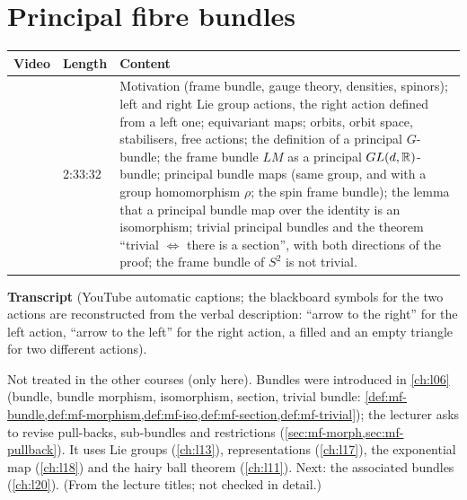 \chapter{Principal fibre bundles}\label{ch:l19}
\providecommand{\lact}{\mathbin{\triangleright}}
\providecommand{\ract}{\mathbin{\triangleleft}}
\providecommand{\lactf}{\mathbin{\blacktriangleright}}
\providecommand{\ractf}{\mathbin{\blacktriangleleft}}
\begin{paracol}{2}

\begin{sources}
\begin{tabularx}{\linewidth}{@{}l l L@{}}
\toprule
\textbf{Video} & \textbf{Length} & \textbf{Content}\\
\midrule
{} & 2:33:32 & Motivation (frame bundle, gauge theory, densities, spinors); left and right Lie group actions, the right action defined from a left one; equivariant maps; orbits, orbit space, stabilisers, free actions; the definition of a principal $G$-bundle; the frame bundle $LM$ as a principal $GL(d,\mathbb{R})$-bundle; principal bundle maps (same group, and with a group homomorphism $\rho$; the spin frame bundle); the lemma that a principal bundle map over the identity is an isomorphism; trivial principal bundles and the theorem ``trivial $\Leftrightarrow$ there is a section'', with both directions of the proof; the frame bundle of $S^2$ is not trivial.\\
\bottomrule
\end{tabularx}

\smallskip
\textbf{Transcript}  (YouTube automatic captions; the blackboard symbols for the two actions are reconstructed from the verbal description: ``arrow to the right'' for the left action, ``arrow to the left'' for the right action, a filled and an empty triangle for two different actions).
\end{sources}

\begin{reading}
Not treated in the other courses (only here). Bundles were introduced in \cref{ch:l06} (bundle, bundle morphism, isomorphism, section, trivial bundle: \cref{def:mf-bundle,def:mf-morphism,def:mf-iso,def:mf-section,def:mf-trivial}); the lecturer asks to revise pull-backs, sub-bundles and restrictions (\cref{sec:mf-morph,sec:mf-pullback}). It uses Lie groups (\cref{ch:l13}), representations (\cref{ch:l17}), the exponential map (\cref{ch:l18}) and the hairy ball theorem (\cref{ch:l11}). Next: the associated bundles (\cref{ch:l20}). (From the lecture titles; not checked in detail.)
\end{reading}


\end{paracol}

